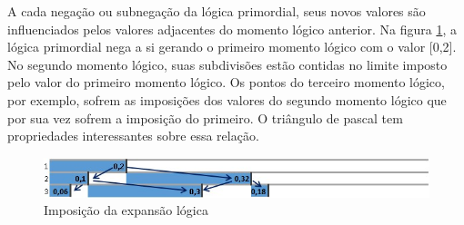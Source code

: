 A cada negação ou subnegação da lógica primordial, seus novos valores são influenciados pelos valores adjacentes do momento lógico anterior. Na figura \ref{fig:imposition_of_binomial_expansion}, a lógica primordial nega a si gerando o primeiro momento lógico com o valor [0,2].  No segundo momento lógico, suas subdivisões estão contidas no limite imposto pelo valor do primeiro momento lógico. Os pontos do terceiro momento lógico, por exemplo, sofrem as imposições dos valores do segundo momento lógico que por sua vez sofrem a imposição do primeiro. O triângulo de pascal tem propriedades interessantes sobre essa relação. 
	\begin{figure}[H]
	\caption{Imposição da expansão lógica}
	\label{fig:imposition_of_binomial_expansion}
	\centering
	\includegraphics[scale=.75]{sections/images/imposition_of_binomial_expansion.jpg}
	\end{figure}

